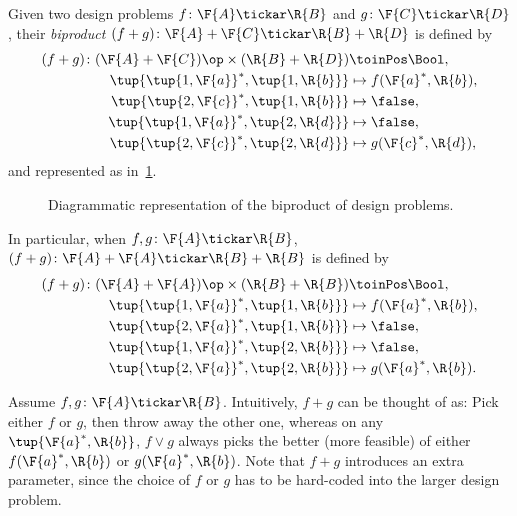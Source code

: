\begin{definition}
Given two design problems $f\colon \F{A} \tickar \R{B}$ and $g\colon \F{C} \tickar \R{D}$, their \emph{biproduct} $(f + g)\colon \F{A} + \F{C} \tickar \R{B} + \R{D}$ is defined by
\begin{equation}
\begin{aligned}
    (f + g)\colon (\F{A} + \F{C})\op  \times (\R{B} + \R{D}) & \toinPos \Bool,  \\
            \tup{ \tup{1,\F{a}}^*, \tup{1,\R{b}}} & \mapsto f(\F{a}^*, \R{b}), \\
            \tup{ \tup{2,\F{c}}^*, \tup{1,\R{b}}} & \mapsto \false, \\
            \tup{ \tup{1,\F{a}}^*, \tup{2,\R{d}}} & \mapsto \false, \\
            \tup{ \tup{2,\F{c}}^*, \tup{2,\R{d}}} & \mapsto g(\F{c}^*, \R{d}),
\end{aligned}
\end{equation}
and represented as in~\cref{fig:biproductdp}.

\begin{figure}[h!]
\begin{center}
\end{center}
\caption{Diagrammatic representation of the biproduct of design problems. \label{fig:biproductdp}}
\end{figure}
In particular, when $f, g\colon \F{A} \tickar \R{B}$, $(f + g)\colon \F{A} + \F{A} \tickar \R{B} + \R{B}$ is defined by
\begin{equation}
\begin{aligned}
    (f + g) \colon (\F{A} + \F{A})\op  \times (\R{B} + \R{B}) & \toinPos \Bool,  \\
            \tup{ \tup{1, \F{a}}^*, \tup{1, \R{b}}} & \mapsto f(\F{a}^*, \R{b}), \\
            \tup{ \tup{2, \F{a}}^*, \tup{1, \R{b}}} & \mapsto \false, \\
            \tup{ \tup{1, \F{a}}^*, \tup{2, \R{b}}} & \mapsto \false, \\
            \tup{ \tup{2, \F{a}}^*, \tup{2, \R{b}}} & \mapsto g(\F{a}^*, \R{b}).
\end{aligned}
\end{equation}
\end{definition}


Assume $f,g \colon \F{A} \tickar \R{B}$. Intuitively, $f+g$ can be thought of as: Pick either $f$ or $g$, then throw away the other one, whereas on any $\tup{\F{a}^*,\R{b}}$, $f \vee g$ always picks the better (more feasible) of either $f(\F{a}^*,\R{b})$ or $g(\F{a}^*,\R{b})$. Note that $f+g$ introduces an extra parameter, since the choice of $f$ or $g$ has to be hard-coded into the larger design problem.


